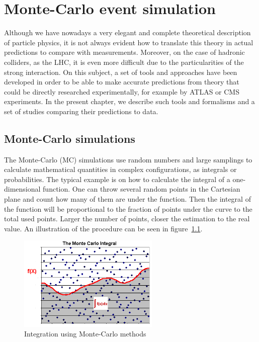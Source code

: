 \chapter[MC event generation]{Monte-Carlo event simulation}
\label{chap:MC}

Although we have nowadays a very elegant and complete theoretical description of particle physics, it is not always evident how to translate this theory in actual predictions to compare with measurements. Moreover, on the case of hadronic colliders, as the LHC, it is even more difficult due to the particularities of the strong interaction. On this subject, a set of tools and approaches have been developed in order to be able to make accurate predictions from theory that could be directly researched experimentally, for example by ATLAS or CMS experiments. In the present chapter, we describe such tools and formalisms and a set of studies comparing their predictions to data. 

\section{Monte-Carlo simulations}
\label{sec:MC}

The Monte-Carlo (MC) simulations use random numbers and large samplings to calculate mathematical quantities in complex configurations, as integrals or probabilities. The typical example is on how to calculate the integral of a one-dimensional function. One can throw several random points in the Cartesian plane and count how many of them are under the function. Then the integral of the function will be proportional to the fraction of points under the curve to the total used points. Larger the number of points, closer the estimation to the real value. An illustration of the procedure can be seen in figure~\ref{fig:mc_int}.

\begin{figure}[!Hhtbp]
  \begin{center}
    \includegraphics[width=0.6\textwidth]{figs/mc_integral.png}
    \caption{Integration using Monte-Carlo methods}
    \label{fig:mc_int}
  \end{center}
\end{figure}

